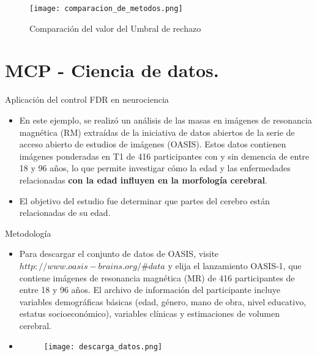 \begin{frame}
\begin{figure}[H]
\centering \label{comparacion_metodos}
\texttt{[image: comparacion\_de\_metodos.png]}
\caption{Comparación del valor del Umbral de rechazo}
\end{figure}
\end{frame}

\section{MCP - Ciencia de datos.}
\begin{frame}{Aplicación del control FDR en neurociencia}
    
    	\begin{itemize}[<+- | alert@+>]
		
		\item En este ejemplo, se realizó un análisis de las masas en imágenes de resonancia magnética (RM) extraídas de la iniciativa de datos abiertos de la serie de acceso abierto de estudios de imágenes (OASIS). Estos datos contienen imágenes ponderadas en T1 de 416 participantes con y sin demencia de entre 18 y 96 años, lo que permite investigar cómo la edad y las enfermedades relacionadas \textbf{con la edad influyen en la morfología cerebral}.\\
		\item El objetivo del estudio fue determinar que partes del cerebro están relacionadas de su edad.
	\end{itemize}

\end{frame}

\begin{frame}{Metodología}
    
    \begin{itemize}[<+- | alert@+>]
		
		\item Para descargar el conjunto de datos de OASIS, visite $http://www.oasis-brains.org/\#data$ y elija el lanzamiento OASIS-1, que contiene imágenes de resonancia magnética (MR) de 416 participantes de entre 18 y 96 años. El archivo de información del participante incluye variables demográficas básicas (edad, género, mano de obra, nivel educativo, estatus socioeconómico), variables clínicas y estimaciones de volumen cerebral. 
		
		\item[] \begin{figure}[H]
\centering 
\texttt{[image: descarga\_datos.png]}
\end{figure}
	\end{itemize}
\end{frame}

